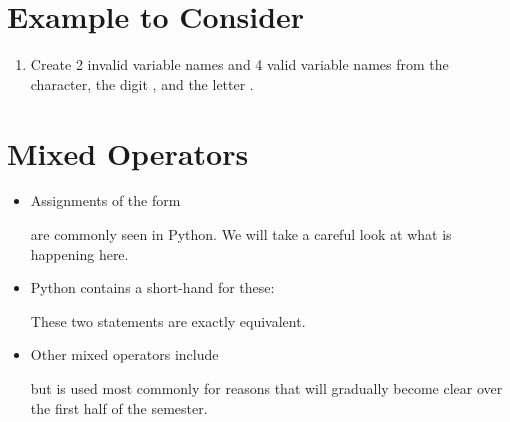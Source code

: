 \documentclass[letterpaper,10pt,english]{sphinxmanual}
\begin{document}
\section{Example to Consider}
\label{\detokenize{lecture_notes/lec02_calculator:example-to-consider}}\begin{enumerate}
\item {} 
Create 2 invalid variable names and 4 valid variable names from the
\sphinxcode{\sphinxupquote{\_}} character, the digit , and the letter .

\end{enumerate}


\section{Mixed Operators}
\label{\detokenize{lecture_notes/lec02_calculator:mixed-operators}}\begin{itemize}
\item {} 
Assignments of the form

%
\begin{sphinxVerbatim}[commandchars=\\\{\}]
    
\end{sphinxVerbatim}

are commonly seen in Python. We will take a careful look at what is
happening here.

\item {} 
Python contains a short-hand for these:

%
\begin{sphinxVerbatim}[commandchars=\\\{\}]
  
\end{sphinxVerbatim}

These two statements are exactly equivalent.

\item {} 
Other mixed operators include

%
\begin{sphinxVerbatim}[commandchars=\\\{\}]
         
\end{sphinxVerbatim}

but \sphinxcode{\sphinxupquote{+=}} is used most commonly for reasons that will gradually
become clear over the first half of the semester.

\end{itemize}
\end{document}
